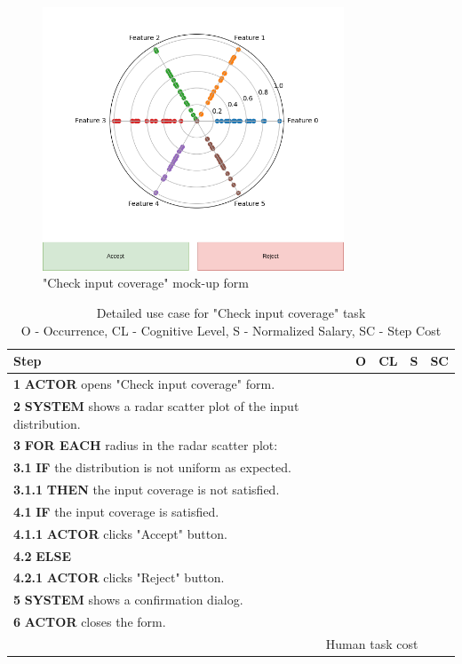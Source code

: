 \begin{figure}[H]
\centering
\includegraphics[width=0.8\textwidth]{figures/check_input_coverage.png}
\caption{"Check input coverage" mock-up form}
\end{figure}

\begin{table}[H]
\centering
\begin{tabularx}{\textwidth}{|X|c|c|c|c|}
\hline
\textbf{Step} & \textbf{O} & \textbf{CL} & \textbf{S} & \textbf{SC} \\
\hline
\textbf{1} \textbf{ACTOR} opens "Check input coverage" form. & & & & \\
\hline
\textbf{2} \textbf{SYSTEM} shows a radar scatter plot of the input distribution. & & & & \\
\hline
\textbf{3} \textbf{FOR EACH} radius in the radar scatter plot: & & & & \\
\hline
\textbf{3.1} \textbf{IF} the distribution is not uniform as expected. & & & & \\
\hline
\textbf{3.1.1} \textbf{THEN} the input coverage is not satisfied. & & & & \\
\hline
\textbf{4.1} \textbf{IF} the input coverage is satisfied. & & & & \\
\hline
\textbf{4.1.1} \textbf{ACTOR} clicks "Accept" button. & & & & \\
\hline
\textbf{4.2} \textbf{ELSE} & & & & \\
\hline
\textbf{4.2.1} \textbf{ACTOR} clicks "Reject" button. & & & & \\
\hline
\textbf{5} \textbf{SYSTEM} shows a confirmation dialog. & & & & \\
\hline
\textbf{6} \textbf{ACTOR} closes the form. & & & & \\
\hline
\multicolumn{4}{|r|}{Human task cost} & \\
\hline
\end{tabularx}
\caption{Detailed use case for "Check input coverage" task\\ 
O - Occurrence, CL - Cognitive Level, S - Normalized Salary, SC - Step Cost}
\label{table:check_input_coverage}
\end{table}

